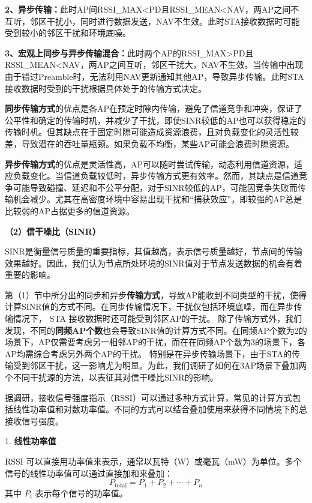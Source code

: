\documentclass[bwprint]{gmcmthesis}
\begin{document}
\textbf{2、异步传输：}此时AP间RSSI\_MAX<PD且RSSI\_MEAN<NAV，两AP之间不互听，邻区干扰小，同时进行数据发送，NAV不生效。此时STA接收数据时可能受到较小的邻区干扰和环境底噪。

\textbf{3、宏观上同步与异步传输混合：}此时两个AP的RSSI\_MAX>PD且RSSI\_MEAN<NAV，两AP之间互听，邻区干扰大，NAV不生效。当传输中出现由于错过Preamble时，无法利用NAV更新通知其他AP，导致异步传输。此时STA接收数据时受到的干扰根据具体处于的传输方式决定。


\textbf{同步传输方式}的优点是各AP在预定时隙内传输，避免了信道竞争和冲突，保证了公平性和确定的传输时机，并减少了干扰，即使SINR较低的AP也可以获得稳定的传输时机。但其缺点在于固定时隙可能造成资源浪费，且对负载变化的灵活性较差，导致潜在的吞吐量瓶颈。如果负载不均衡，某些AP可能会浪费时隙资源。

\textbf{异步传输方式}的优点是灵活性高，AP可以随时尝试传输，动态利用信道资源，适应负载变化。当信道负载较低时，异步传输方式更有效率。然而，其缺点是信道竞争可能导致碰撞、延迟和不公平分配，对于SINR较低的AP，可能因竞争失败而传输机会减少。尤其在高密度环境中容易出现干扰和“捕获效应”，即较强的AP总是比较弱的AP占据更多的信道资源。

\textbf{（2）信干噪比（SINR）}

SINR是衡量信号质量的重要指标，其值越高，表示信号质量越好，节点间的传输效果越好。因此，我们认为节点所处环境的SINR值对于节点发送数据的机会有着重要的影响。

第（1）节中所分出的同步和异步\textbf{传输方式}，导致AP能收到不同类型的干扰，使得计算SINR值的方式不同。在同步传输情况下，干扰仅包括环境底噪，而在异步传输情况下， STA 接收数据时还可能受到邻区AP的干扰。
除了传输方式外，我们发现，不同的\textbf{同频AP个数}也会导致SINR值的计算方式不同。在同频AP个数为2的场景下，AP仅需要考虑另一相邻AP的干扰，而在在同频AP个数为3的场景下，各AP均需综合考虑另外两个AP的干扰。
特别是在异步传输场景下，由于STA的传输受到邻区干扰，这一影响尤为明显。为此，我们调研了如何在3AP场景下叠加两个不同干扰源的方法，以表征其对信干噪比SINR的影响。

据调研\cite{rn1}，接收信号强度指示（RSSI）可以通过多种方式计算，常见的计算方式包括线性功率值和对数功率值。不同的方式可以结合叠加使用来获得不同情境下的总接收信号强度。

1. \textbf{线性功率值}

RSSI 可以直接用功率值来表示，通常以瓦特（W）或毫瓦（mW）为单位。多个信号的线性功率值可以通过直接加和来叠加：
\[
P_{\text{total}} = P_1 + P_2 + \cdots + P_n
\]
其中 $P_i$ 表示每个信号的功率值。
\end{document}
